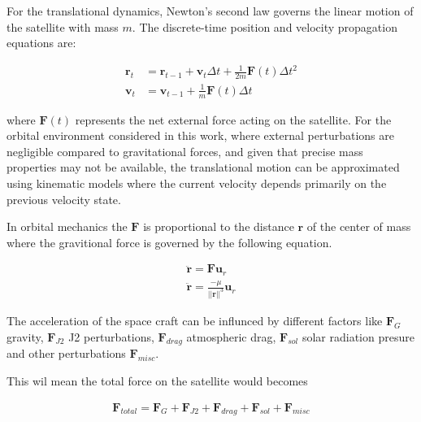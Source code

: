 
\label{sec:dynamics}


For the translational dynamics, Newton's second law governs the linear motion of the satellite with mass $m$. The discrete-time position and velocity propagation equations are:

\begin{align}
\mathbf{r}_t &= \mathbf{r}_{t-1} + \mathbf{v}_t\Delta t + \frac{1}{2m}\mathbf{F}(t)\Delta t^2 \\
\mathbf{v}_t &= \mathbf{v}_{t-1} + \frac{1}{m}\mathbf{F}(t)\Delta t
\end{align}

\noindent where $\mathbf{F}(t)$ represents the net external force acting on the satellite. For the orbital environment 
considered in this work, where external perturbations are negligible compared to gravitational forces, and given that 
precise mass properties may not be available, the translational motion can be approximated using kinematic models where 
the current velocity depends primarily on the previous velocity state.


In orbital mechanics the $\mathbf{F}$ is proportional to the distance $\mathbf{r}$ of the center of mass where the gravitional force is governed by the following equation.


\begin{align}
    \ddot{\mathbf{r}} = \mathbf{F}\mathbf{u}_r \\
    \ddot{\mathbf{r}} = \frac{-\mu}{||\mathbf{r}||^3}\mathbf{u}_r
\end{align}


The acceleration of the space craft can be influnced by different factors like $\mathbf{F}_{G}$ gravity, $\mathbf{F}_{J2}$ J2 perturbations, $\mathbf{F}_{drag}$ atmospheric drag,
$\mathbf{F}_{sol}$ solar radiation presure and other perturbations $\mathbf{F}_{misc}$.

This wil mean the total force on the satellite would becomes

\begin{align}
    \mathbf{F}_{total} = \mathbf{F}_{G} + \mathbf{F}_{J2} + \mathbf{F}_{drag} + \mathbf{F}_{sol} + \mathbf{F}_{misc}
\end{align}

